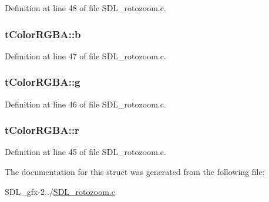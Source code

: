 Definition at line 48 of file S\+D\+L\+\_\+rotozoom.\+c.

\hypertarget{structt_color_r_g_b_a_ab6aa469c65af3c3bc56dd3657698c3b3}{}
\subsubsection[{b}]{ t\+Color\+R\+G\+B\+A\+::b}\label{structt_color_r_g_b_a_ab6aa469c65af3c3bc56dd3657698c3b3}


Definition at line 47 of file S\+D\+L\+\_\+rotozoom.\+c.

\hypertarget{structt_color_r_g_b_a_a22f3efdc47c67f2672be345f7c7e8cb1}{}
\subsubsection[{g}]{ t\+Color\+R\+G\+B\+A\+::g}\label{structt_color_r_g_b_a_a22f3efdc47c67f2672be345f7c7e8cb1}


Definition at line 46 of file S\+D\+L\+\_\+rotozoom.\+c.

\hypertarget{structt_color_r_g_b_a_a96efe754f0357efcfb2fa56447dfb76e}{}
\subsubsection[{r}]{ t\+Color\+R\+G\+B\+A\+::r}\label{structt_color_r_g_b_a_a96efe754f0357efcfb2fa56447dfb76e}


Definition at line 45 of file S\+D\+L\+\_\+rotozoom.\+c.



The documentation for this struct was generated from the following file\+:\begin{DoxyCompactItemize}
\item 
S\+D\+L\+\_\+gfx-\/2../\hyperlink{_s_d_l__rotozoom_8c}{S\+D\+L\+\_\+rotozoom.\+c}\end{DoxyCompactItemize}
